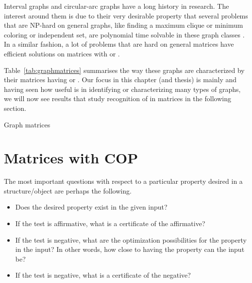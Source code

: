 Interval graphs and circular-arc
graphs have a long history in research.  The interest around them is
due to their very desirable property that several problems that are
NP-hard  on general
graphs, like finding a maximum clique or minimum coloring or
independent set, are polynomial time solvable in these graph classes
\cite{clrs01}.
In a similar fashion, a lot of problems that are hard on general
matrices have efficient solutions on matrices with \COP or \CROP
\cite[more citations pg.\,33]{d08phd}.

Table~\ref{tab:graphmatrices} summarises the way these graphs are
characterized by their matrices having \COP or \CROP.
Our focus in this chapter (and thesis) is mainly \COP and 
having seen how useful \COP is in identifying or characterizing many
types of graphs, we will now see results that study recognition of \COP
in matrices in the following section.



\begin{table}[htbp]
  \centering
 \caption{\figtabsize Graph matrices }
  \label{tab:graphmatrices}
\end{table}


\section{Matrices with COP}
\label{sec:surveycoptest}

The most important questions with respect to a particular 
property desired in a structure/object are perhaps the following.
\begin{itemize}%
\singlespacing
\item Does the desired property exist in the given input?
\item If the test is affirmative, what is a certificate of the affirmative?
\item If the test is negative, what are the optimization possibilities
  for the property in the input? In other words, how close to having the
  property can the input be?
\item If the test is negative, what is a certificate of the negative?
\end{itemize}


